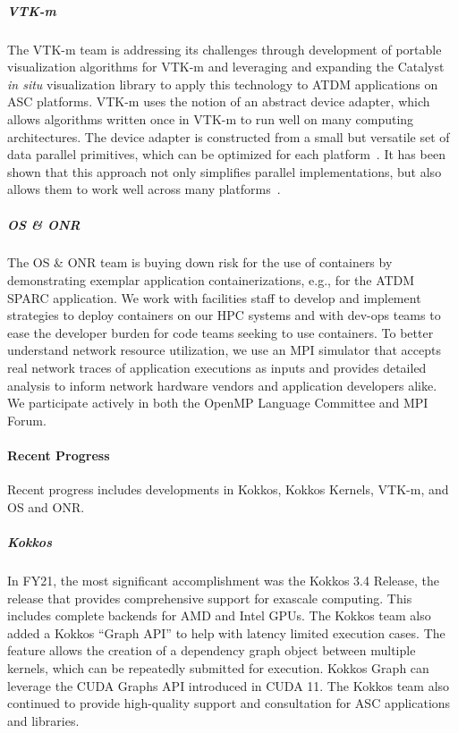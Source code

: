 \subparagraph{VTK-m} The VTK-m team is addressing its challenges through
development of portable visualization algorithms for VTK-m and leveraging and
expanding the Catalyst~\cite{Catalyst}  \emph{in situ} visualization library to
apply this technology to ATDM applications on ASC platforms.  VTK-m uses the
notion of an abstract device adapter, which allows algorithms written once in
VTK-m to run well on many computing architectures.  The device adapter is
constructed from a small but versatile set of data parallel primitives, which
can be optimized for each platform~\cite{Blelloch1990}.  It has been shown that
this approach not only simplifies parallel implementations, but also allows
them to work well across many platforms~\cite{Lo2012,Larsen2015,Moreland2015}.

\subparagraph{OS \& ONR} The OS \& ONR team is buying down risk for the use of containers by demonstrating exemplar application containerizations, e.g., for the ATDM SPARC application.  We work with facilities staff to develop and implement strategies to deploy containers on our HPC systems and with dev-ops teams to ease the developer burden for code teams seeking to use containers.  To better understand network resource utilization, we use an MPI simulator that accepts real network traces of application executions as inputs and provides detailed analysis to inform network hardware vendors and application developers alike.  We participate actively in both the OpenMP Language Committee and MPI Forum.



\paragraph{Recent Progress} %
Recent progress includes developments in Kokkos, Kokkos Kernels, VTK-m, and OS and ONR.

\subparagraph{Kokkos}  In FY21, the most significant accomplishment was the Kokkos 3.4 Release, the release that provides comprehensive support for exascale computing.  This includes complete backends for AMD and Intel GPUs.  The Kokkos team also added a Kokkos “Graph API” to help with latency limited execution cases.  The feature allows the creation of a dependency graph object between multiple kernels, which can be repeatedly submitted for execution. Kokkos Graph can leverage the CUDA Graphs API introduced in CUDA 11.  The Kokkos team also continued to provide high-quality support and consultation for ASC applications and libraries.



